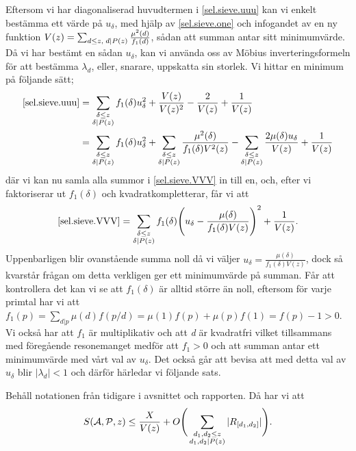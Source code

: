Eftersom vi har diagonaliserad huvudtermen i \eqref{sel.sieve.uuu} kan vi enkelt bestämma ett värde på \(u_\delta\), med hjälp av \eqref{sel.sieve.one} och infogandet av en ny funktion \(V(z) = \sum_{d\leq z,\; d\mid P(z)}\frac{\mu^2(d)}{f_1(d)}\), sådan att summan antar sitt minimumvärde.
Då vi har bestämt en sådan \(u_\delta\), kan vi använda oss av Möbius inverteringsformeln för att bestämma \(\lambda_d\), eller, snarare, uppskatta sin storlek.
Vi hittar en minimum på följande sätt;
\begin{align}
    \eqref{sel.sieve.uuu} &= \sum_{\substack{\delta\leq z\\\delta|P(z)}} f_1(\delta)u_\delta^2 + \frac{V(z)}{V(z)^2} - \frac{2}{V(z)} + \frac{1}{V(z)}\nonumber\\
    &= \sum_{\substack{\delta\leq z\\\delta|P(z)}} f_1(\delta)u_\delta^2 + \sum_{\substack{\delta\leq z\\ \delta|P(z)}}\frac{\mu^2(\delta)}{f_1(\delta)V^2(z)} - \sum_{\substack{\delta\leq z\\\delta |P(z)}}\frac{2\mu(\delta)u_\delta}{V(z)} + \frac{1}{V(z)}\label{sel.sieve.VVV}
\end{align}
där vi kan nu samla alla summor i \eqref{sel.sieve.VVV} in till en, och, efter vi faktoriserar ut \(f_1(\delta)\) och kvadratkompletterar, får vi att
\begin{equation}
    \eqref{sel.sieve.VVV} = \sum_{\substack{\delta\leq z\\\delta|P(z)}}f_1(\delta)\Bigg(u_\delta - \frac{\mu(\delta)}{f_1(\delta)V(z)}\Bigg)^2 + \frac{1}{V(z)}.\nonumber
\end{equation}
Uppenbarligen blir ovanstående summa noll då vi väljer \(u_\delta = \frac{\mu(\delta)}{f_1(\delta)V(z)}\), dock så kvarstår frågan om detta verkligen ger ett minimumvärde på summan. Får att kontrollera det kan vi se att \(f_1(\delta)\) är alltid större än noll, eftersom för varje primtal har vi att \(f_1(p) = \sum_{d|p}\mu(d)f({p}/{d}) = \mu(1)f(p) + \mu(p)f(1) = f(p) - 1 > 0\). 
Vi också har att \(f_1\) är multiplikativ och att \textit{d} är kvadratfri vilket tillsammans med föregående resonemanget medför att \(f_1 > 0\) och att summan antar ett minimumvärde med vårt val av \(u_\delta\).
Det också går att bevisa \cite[s. 122-123]{cojocarumurty} att med detta val av \(u_\delta\) blir \(|\lambda_d| < 1\) och därför härledar vi följande sats.
\begin{theorem}\label{sel.sieve.thm}
Behåll notationen från tidigare i avsnittet och rapporten. Då har vi att
\begin{equation}
    S(\mathcal{A}, \mathcal{P}, z) \leq \frac{X}{V(z)} + O\Bigg(\sum_{\substack{d_1,d_2\leq z\\d_1,d_2\mid P(z)}}|R_{[d_1, d_2]}|\Bigg).\nonumber
\end{equation}
\end{theorem}
